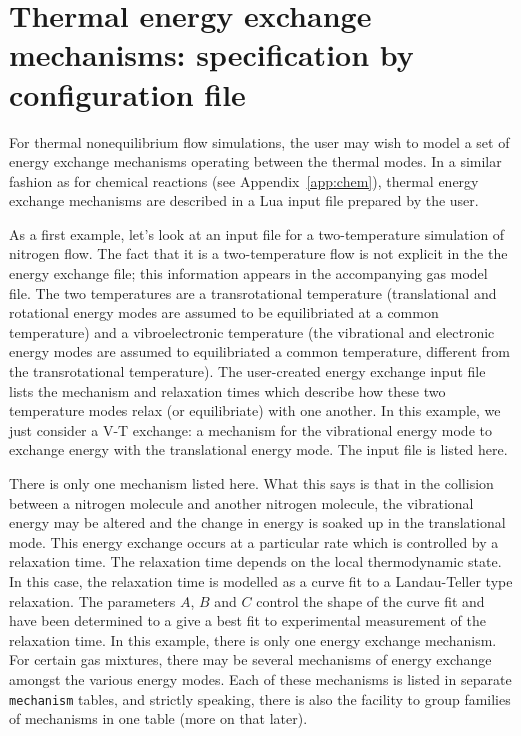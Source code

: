 \section{Thermal energy exchange mechanisms: specification by configuration file}
\label{app:therm-exchange}
For thermal nonequilibrium flow simulations, the user may wish to model a set of 
energy exchange mechanisms operating between the thermal modes.
In a similar fashion as for chemical reactions (see Appendix~\ref{app:chem}), 
thermal energy exchange mechanisms are described in a Lua input file prepared by
the user.

As a first example, let's look at an input file for a two-temperature
simulation of nitrogen flow.
The fact that it is a two-temperature flow is not explicit in the
the energy exchange file; this information appears in the accompanying
gas model file.
The two temperatures are a transrotational temperature (translational and
rotational energy modes are assumed to be equilibriated at a common temperature)
and a vibroelectronic temperature (the vibrational and electronic energy modes
are assumed to equilibriated a common temperature, different from the transrotational
temperature).
The user-created energy exchange input file lists the mechanism and relaxation times
which describe how these two temperature modes relax (or equilibriate) with one another.
In this example, we just consider a V-T exchange: a mechanism for the vibrational
energy mode to exchange energy with the translational energy mode.
The input file is listed here.\\
\topbar

\bottombar
There is only one mechanism listed here.
What this says is that in the collision between a nitrogen molecule
and another nitrogen molecule, the vibrational energy may be altered and
the change in energy is soaked up in the translational mode.
This energy exchange occurs at a particular rate which is controlled
by a relaxation time.
The relaxation time depends on the local thermodynamic state.
In this case, the relaxation time is modelled as a curve fit to a
Landau-Teller type relaxation.
The parameters $A$, $B$ and $C$ control the shape of the curve fit and
have been determined to a give a best fit to experimental measurement
of the relaxation time.
In this example, there is only one energy exchange mechanism.
For certain gas mixtures, there may be several mechanisms of energy exchange
amongst the various energy modes.
Each of these mechanisms is listed in separate \texttt{mechanism} tables,
and strictly speaking, there is also the facility to group families
of mechanisms in one table (more on that later).

